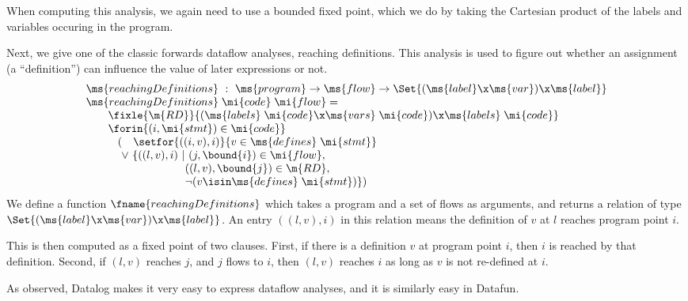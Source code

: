 When computing this analysis, we again need to use a bounded fixed
point, which we do by taking the Cartesian product of the labels and
variables occuring in the program.


Next, we give one of the classic forwards dataflow analyses,
reaching definitions. This analysis is used to figure out whether
an assignment (a ``definition'') can influence the value of later
expressions or not.
\[\begin{array}{l}
\ms{reachingDefinitions} ~:~ \ms{program} \uto \ms{flow}
\uto \Set{(\ms{label} \x \ms{var}) \x \ms{label}}\\
\ms{reachingDefinitions} \;\mi{code} \;\mi{flow} =\\
\hspace{2em}\fixle{\m{RD}}{%
  (\ms{labels}\;\mi{code} \x \ms{vars}\;\mi{code}) \x \ms{labels}\;\mi{code} }\\
\hspace{2em}\forin{(i,\mi{stmt}) \in \mi{code}}\\
\hspace{2.875em} (
\phantom{\vee~}\setfor{((i,v), i)}{v \in \ms{defines}\;\mi{stmt}}\\
\hspace{3.2em} \vee~ \{((l,v), i) ~|~ (j,\bound{i}) \in \mi{flow},\\
\hspace{8.95em}((l,v), \bound{j}) \in \m{RD},\\
\hspace{8.95em}\neg(v \isin \ms{defines}\;\mi{stmt})\})
\end{array}\]
We define a function $\fname{reachingDefinitions}$ which takes a
program and a set of flows as arguments, and returns a relation of
type $\Set{(\ms{label} \x \ms{var}) \x \ms{label}}$. An entry $((l,v),
i)$ in this relation means the definition of $v$ at $l$ reaches program
point $i$.

This is then computed as a fixed point of two clauses. First, if there
is a definition $v$ at program point $i$, then $i$ is reached by that
definition. Second, if $(l,v)$ reaches $j$, and $j$ flows to $i$, then
$(l,v)$ reaches $i$ as long as $v$ is not re-defined at $i$.

As \citet{whaley-lam} observed, Datalog makes it very easy to express
dataflow analyses, and it is similarly easy in Datafun.
